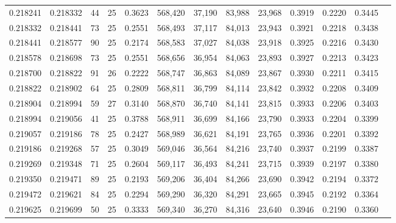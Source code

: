 \begin{tabular}{rrrrrrrrrrrrr}
0.218241 & 0.218332 &    44 &  25 &                                     0.3623 & 568,420 &  37,190 &  83,988 &  23,968 & 0.3919 & 0.2220 & 0.3445 \\
0.218332 & 0.218441 &    73 &  25 &                                     0.2551 & 568,493 &  37,117 &  84,013 &  23,943 & 0.3921 & 0.2218 & 0.3438 \\
0.218441 & 0.218577 &    90 &  25 &                                     0.2174 & 568,583 &  37,027 &  84,038 &  23,918 & 0.3925 & 0.2216 & 0.3430 \\
0.218578 & 0.218698 &    73 &  25 &                                     0.2551 & 568,656 &  36,954 &  84,063 &  23,893 & 0.3927 & 0.2213 & 0.3423 \\
0.218700 & 0.218822 &    91 &  26 &                                     0.2222 & 568,747 &  36,863 &  84,089 &  23,867 & 0.3930 & 0.2211 & 0.3415 \\
0.218822 & 0.218902 &    64 &  25 &                                     0.2809 & 568,811 &  36,799 &  84,114 &  23,842 & 0.3932 & 0.2208 & 0.3409 \\
0.218904 & 0.218994 &    59 &  27 &                                     0.3140 & 568,870 &  36,740 &  84,141 &  23,815 & 0.3933 & 0.2206 & 0.3403 \\
0.218994 & 0.219056 &    41 &  25 &                                     0.3788 & 568,911 &  36,699 &  84,166 &  23,790 & 0.3933 & 0.2204 & 0.3399 \\
0.219057 & 0.219186 &    78 &  25 &                                     0.2427 & 568,989 &  36,621 &  84,191 &  23,765 & 0.3936 & 0.2201 & 0.3392 \\
0.219186 & 0.219268 &    57 &  25 &                                     0.3049 & 569,046 &  36,564 &  84,216 &  23,740 & 0.3937 & 0.2199 & 0.3387 \\
0.219269 & 0.219348 &    71 &  25 &                                     0.2604 & 569,117 &  36,493 &  84,241 &  23,715 & 0.3939 & 0.2197 & 0.3380 \\
0.219350 & 0.219471 &    89 &  25 &                                     0.2193 & 569,206 &  36,404 &  84,266 &  23,690 & 0.3942 & 0.2194 & 0.3372 \\
0.219472 & 0.219621 &    84 &  25 &                                     0.2294 & 569,290 &  36,320 &  84,291 &  23,665 & 0.3945 & 0.2192 & 0.3364 \\
0.219625 & 0.219699 &    50 &  25 &                                     0.3333 & 569,340 &  36,270 &  84,316 &  23,640 & 0.3946 & 0.2190 & 0.3360 \\

\end{tabular}
